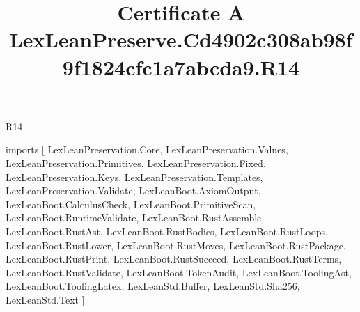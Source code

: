 \begin{lexlean}{R14}
\title{Certificate A LexLeanPreserve.Cd4902c308ab98f9f1824cfc1a7abcda9.R14}
\begin{coremodule}
imports [
  LexLeanPreservation.Core,
  LexLeanPreservation.Values,
  LexLeanPreservation.Primitives,
  LexLeanPreservation.Fixed,
  LexLeanPreservation.Keys,
  LexLeanPreservation.Templates,
  LexLeanPreservation.Validate,
  LexLeanBoot.AxiomOutput,
  LexLeanBoot.CalculusCheck,
  LexLeanBoot.PrimitiveScan,
  LexLeanBoot.RuntimeValidate,
  LexLeanBoot.RustAssemble,
  LexLeanBoot.RustAst,
  LexLeanBoot.RustBodies,
  LexLeanBoot.RustLoops,
  LexLeanBoot.RustLower,
  LexLeanBoot.RustMoves,
  LexLeanBoot.RustPackage,
  LexLeanBoot.RustPrint,
  LexLeanBoot.RustSucceed,
  LexLeanBoot.RustTerms,
  LexLeanBoot.RustValidate,
  LexLeanBoot.TokenAudit,
  LexLeanBoot.ToolingAst,
  LexLeanBoot.ToolingLatex,
  LexLeanStd.Buffer,
  LexLeanStd.Sha256,
  LexLeanStd.Text
]


\end{coremodule}
\end{lexlean}
